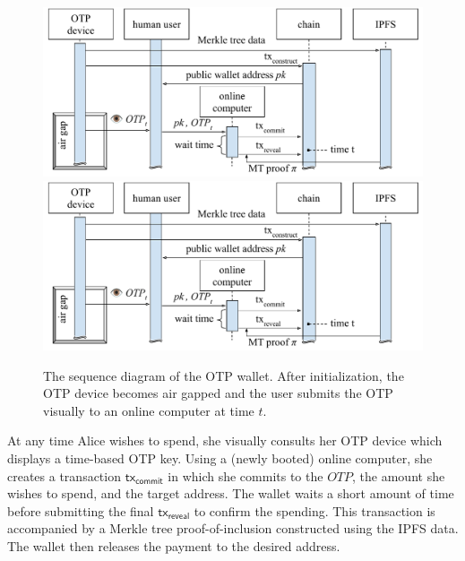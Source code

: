 \begin{figure}[ht]
    \caption{The sequence diagram of the OTP wallet. After initialization, the OTP device
             becomes air gapped and the user submits the OTP visually to an online computer
             at time $t$.}
    \centering
    \iflncs
        \includegraphics[width=\textwidth,keepaspectratio]{figures/otp-sequence-diagram.pdf}
    \else
        \includegraphics[width=0.7 \textwidth,keepaspectratio]{figures/otp-sequence-diagram.pdf}
    \fi
    \label{fig.sequence-diagram}
\end{figure}

At any time Alice wishes to spend, she visually consults her OTP device which displays a time-based
OTP key. Using a (newly booted) online computer, she creates a transaction $\textsf{tx}_\textsf{commit}$ in
which she commits to the $OTP$, the amount she wishes to spend, and the target address.
The wallet waits a short amount of time before submitting the final $\textsf{tx}_\textsf{reveal}$
to confirm the spending. This transaction is accompanied by a Merkle tree proof-of-inclusion
constructed using the IPFS data. The wallet then releases the payment to the desired address.

